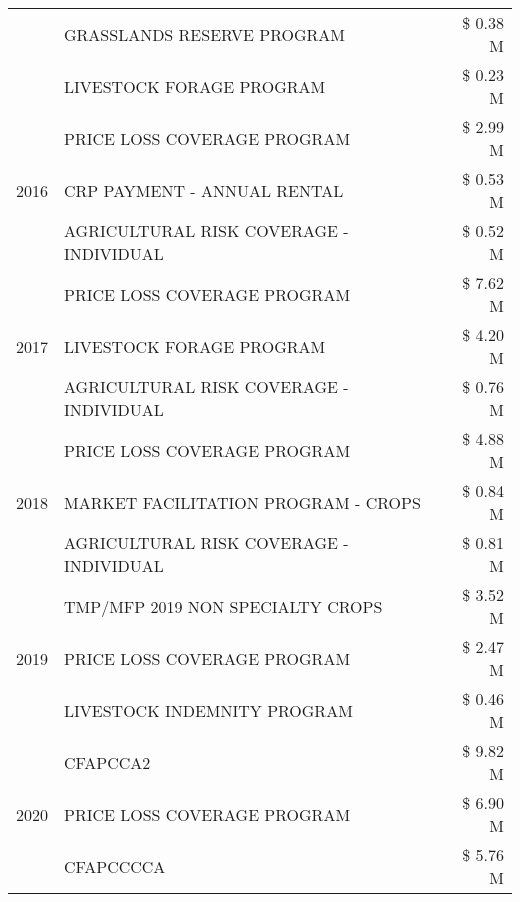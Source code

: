 \begin{tabular}{llr}
 & GRASSLANDS RESERVE PROGRAM & \$ 0.38 M \\
 & LIVESTOCK FORAGE PROGRAM & \$ 0.23 M \\
\cline{1-3}
\multirow[t]{3}{*}{2016} & PRICE LOSS COVERAGE PROGRAM & \$ 2.99 M \\
 & CRP PAYMENT - ANNUAL RENTAL & \$ 0.53 M \\
 & AGRICULTURAL RISK COVERAGE - INDIVIDUAL & \$ 0.52 M \\
\cline{1-3}
\multirow[t]{3}{*}{2017} & PRICE LOSS COVERAGE PROGRAM & \$ 7.62 M \\
 & LIVESTOCK FORAGE PROGRAM & \$ 4.20 M \\
 & AGRICULTURAL RISK COVERAGE - INDIVIDUAL & \$ 0.76 M \\
\cline{1-3}
\multirow[t]{3}{*}{2018} & PRICE LOSS COVERAGE PROGRAM & \$ 4.88 M \\
 & MARKET FACILITATION PROGRAM - CROPS & \$ 0.84 M \\
 & AGRICULTURAL RISK COVERAGE - INDIVIDUAL & \$ 0.81 M \\
\cline{1-3}
\multirow[t]{3}{*}{2019} & TMP/MFP 2019 NON SPECIALTY CROPS & \$ 3.52 M \\
 & PRICE LOSS COVERAGE PROGRAM & \$ 2.47 M \\
 & LIVESTOCK INDEMNITY PROGRAM & \$ 0.46 M \\
\cline{1-3}
\multirow[t]{3}{*}{2020} & CFAPCCA2 & \$ 9.82 M \\
 & PRICE LOSS COVERAGE PROGRAM & \$ 6.90 M \\
 & CFAPCCCCA & \$ 5.76 M \\
\cline{1-3}
\bottomrule
\end{tabular}
